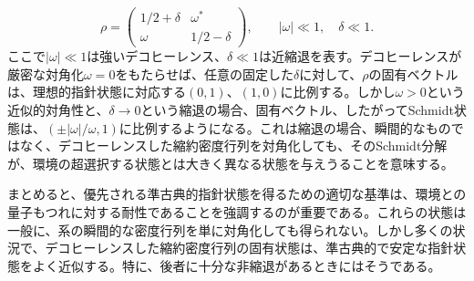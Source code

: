 \hypertarget{srcpage:106}{}\label{srcpage:106}
\begin{equation}\rho=\begin{pmatrix}1/2+\delta&\omega^*\\\omega&1/2-\delta\end{pmatrix},\qquad\lvert\omega\rvert\ll1,\quad\delta\ll1.\tag{2.131}\end{equation}
ここで$\lvert\omega\rvert\ll1$は強いデコヒーレンス、$\delta\ll1$は近縮退を表す。デコヒーレンスが厳密な対角化$\omega=0$をもたらせば、任意の固定した$\delta$に対して、$\rho$の固有ベクトルは、理想的指針状態に対応する$(0,1)$、$(1,0)$に比例する。しかし$\omega>0$という近似的対角性と、$\delta\longrightarrow0$という縮退の場合、固有ベクトル、したがってSchmidt状態は、$(\pm\lvert\omega\rvert/\omega,1)$に比例するようになる。これは縮退の場合、瞬間的なものではなく、デコヒーレンスした縮約密度行列を対角化しても、そのSchmidt分解が、環境の超選択する状態とは大きく異なる状態を与えうることを意味する。

まとめると、優先される準古典的指針状態を得るための適切な基準は、環境との量子もつれに対する耐性であることを強調するのが重要である。これらの状態は一般に、系の瞬間的な密度行列を単に対角化しても得られない。しかし多くの状況で、デコヒーレンスした縮約密度行列の固有状態は、準古典的で安定な指針状態をよく近似する。特に、後者に十分な非縮退があるときにはそうである。

